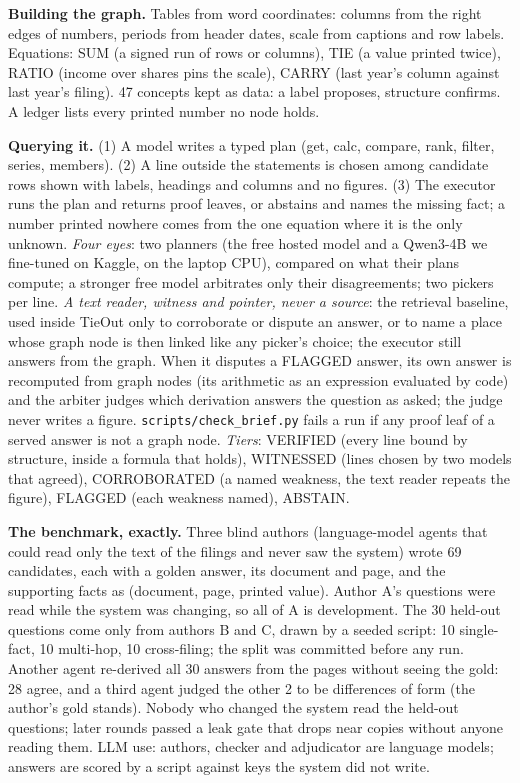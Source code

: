 \documentclass[10pt]{article}
\newcommand{\head}[1]{\vspace{3pt}{\normalsize\bfseries #1}\vspace{1pt}\par}
\newcommand{\sub}[1]{\textbf{#1}}
\begin{document}
\head{(b) Methodology}
\sub{Building the graph.} Tables from word coordinates: columns from the right edges of numbers, periods from header dates, scale from captions and row labels. Equations: SUM (a signed run of rows or columns), TIE (a value printed twice), RATIO (income over shares pins the scale), CARRY (last year's column against last year's filing). 47 concepts kept as data: a label proposes, structure confirms. A ledger lists every printed number no node holds.

\sub{Querying it.} (1) A model writes a typed plan (get, calc, compare, rank, filter, series, members). (2) A line outside the statements is chosen among candidate rows shown with labels, headings and columns and no figures. (3) The executor runs the plan and returns proof leaves, or abstains and names the missing fact; a number printed nowhere comes from the one equation where it is the only unknown. \emph{Four eyes}: two planners (the free hosted model and a Qwen3-4B we fine-tuned on Kaggle, on the laptop CPU), compared on what their plans compute; a stronger free model arbitrates only their disagreements; two pickers per line. \emph{A text reader, witness and pointer, never a source}: the retrieval baseline, used inside TieOut only to corroborate or dispute an answer, or to name a place whose graph node is then linked like any picker's choice; the executor still answers from the graph. When it disputes a FLAGGED answer, its own answer is recomputed from graph nodes (its arithmetic as an expression evaluated by code) and the arbiter judges which derivation answers the question as asked; the judge never writes a figure. \texttt{scripts/check\_brief.py} fails a run if any proof leaf of a served answer is not a graph node. \DevLine{} \emph{Tiers}: VERIFIED (every line bound by structure, inside a formula that holds), WITNESSED (lines chosen by two models that agreed), CORROBORATED (a named weakness, the text reader repeats the figure), FLAGGED (each weakness named), ABSTAIN.

\sub{The benchmark, exactly.} Three blind authors (language-model agents that could read only the text of the filings and never saw the system) wrote 69 candidates, each with a golden answer, its document and page, and the supporting facts as (document, page, printed value). Author A's questions were read while the system was changing, so all of A is development. The 30 held-out questions come only from authors B and C, drawn by a seeded script: 10 single-fact, 10 multi-hop, 10 cross-filing; the split was committed before any run. Another agent re-derived all 30 answers from the pages without seeing the gold: 28 agree, and a third agent judged the other 2 to be differences of form (the author's gold stands). Nobody who changed the system read the held-out questions; later rounds passed a leak gate that drops near copies without anyone reading them. LLM use: authors, checker and adjudicator are language models; answers are scored by a script against keys the system did not write.
\end{document}

